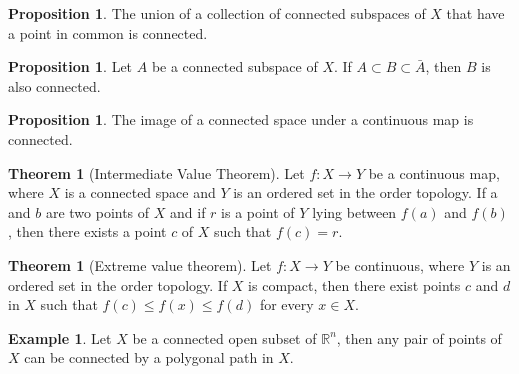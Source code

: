 \documentclass[12pt,a4paper]{book}
\newcommand{\bb}[1]{\mathbb{#1}}
\theoremstyle{definition}
\newtheorem{theo}[defn]{Theorem}
\newtheorem{prop}[defn]{Proposition}
\newtheorem{exam}[defn]{Example}
\begin{document}
\begin{prop}
    The union of a collection of connected subspaces of $X$ that have a point in common is connected.
\end{prop}
\begin{prop}
    Let $A$ be a connected subspace of $X$. If $A \subset B \subset \bar{A}$, then $B$ is also connected.
\end{prop}
\begin{prop}
    The image of a connected space under a continuous map is connected.
\end{prop}
\begin{theo}[Intermediate Value Theorem]
    Let $f: X \rightarrow Y$ be a continuous map, where $X$ is a connected space and $Y$ is an ordered set in the order topology. If a and $b$ are two points of $X$ and if $r$ is a point of $Y$ lying between $f(a)$ and $f(b)$, then there exists a point $c$ of $X$ such that $f(c)=r$.
\end{theo}
\begin{theo}[Extreme value theorem]
    Let $f: X \rightarrow Y$ be continuous, where $Y$ is an ordered set in the order topology. If $X$ is compact, then there exist points $c$ and $d$ in $X$ such that $f(c) \leq f(x) \leq f(d)$ for every $x \in X$.
\end{theo}
\begin{exam}
    Let $X$ be a connected open subset of $\bb{R}^n$, then any pair of points of $X$ 
    can be connected by a polygonal path in $X$.
    \label{example: polygonal path, connected}
\end{exam}
\end{document}
